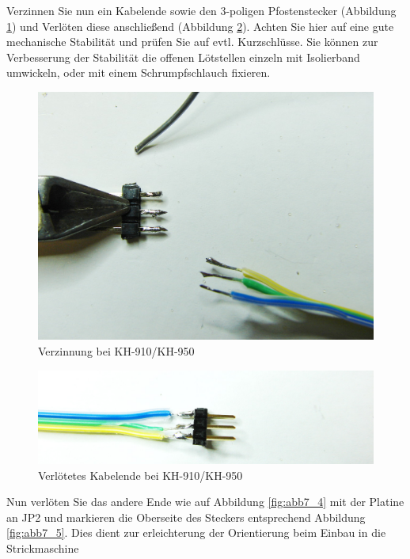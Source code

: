 \documentclass[fleqn,10pt]{SelfArx} %
\begin{document}
Verzinnen Sie nun ein Kabelende sowie den 3-poligen Pfostenstecker (Abbildung \ref{fig:abb7_2}) und Verlöten diese anschließend (Abbildung \ref{fig:abb7_3}). Achten Sie hier auf eine gute mechanische Stabilität und prüfen Sie auf evtl. Kurzschlüsse. Sie können zur Verbesserung der Stabilität die offenen Lötstellen einzeln mit Isolierband umwickeln, oder mit einem Schrumpfschlauch fixieren.

\begin{figure}[tbhp]\centering
\includegraphics[width=\linewidth]{abb7_2}
\caption{Verzinnung bei KH-910/KH-950}
\label{fig:abb7_2}
\end{figure}

\begin{figure}[tbhp]\centering
\includegraphics[width=\linewidth]{abb7_3}
\caption{Verlötetes Kabelende bei KH-910/KH-950}
\label{fig:abb7_3}
\end{figure}

Nun verlöten Sie das andere Ende wie auf Abbildung \ref{fig:abb7_4} mit der Platine an JP2 und markieren die Oberseite des Steckers entsprechend Abbildung \ref{fig:abb7_5}. Dies dient zur erleichterung der Orientierung beim Einbau in die Strickmaschine\par
\end{document}
